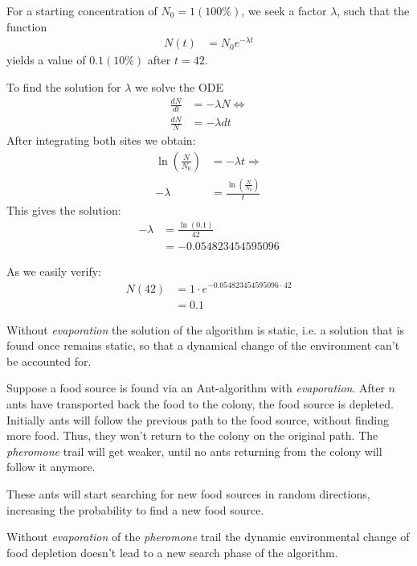\documentclass[10pt,a4paper,boxed]{hmcpset}
\begin{document}
\begin{problem}[Assignment 42]
\end{problem}
\begin{solution}
For a starting concentration of $N_0 = 1 (100\%)$, we seek a factor $\lambda$, such that the function
\begin{align*}
	N(t) & = N_0 e^{-\lambda t}
\end{align*}
yields a value of $0.1 (10\%)$ after $t=42$.

To find the solution for $\lambda$ we solve the ODE
\begin{align*}
	\frac{dN}{dt} & = -\lambda N \Leftrightarrow \\
	\frac{dN}{N} & = -\lambda dt
\end{align*}
After integrating both sites we obtain:
\begin{align*}
	\ln \left( \frac{N}{N_0} \right) & = -\lambda t \Rightarrow \\
	 -\lambda & = \frac{\ln \left( \frac{N}{N_0} \right)}{t} 
\end{align*}
This gives the solution:
\begin{align*}
	 -\lambda & = \frac{\ln \left( 0.1 \right)}{42} \\
	 		  & = -0.054823454595096 
\end{align*}

As we easily verify:
\begin{align*}
	N(42) & = 1 \cdot e^{ -0.054823454595096 \cdot 42} \\
		  & = 0.1
\end{align*}

\end{solution}


\begin{problem}[Assignment 43]
\end{problem}
\begin{solution}
Without \emph{evaporation} the solution of the algorithm is static, i.e. a solution that is found once remains static, so that a dynamical change of the environment can't be accounted for.

Suppose a food source is found via an Ant-algorithm with \emph{evaporation}. After $n$ ants have transported back the food to the colony, the food source is depleted. Initially ants will follow the previous path to the food source, without finding more food. Thus, they won't return to the colony on the original path. The \emph{pheromone} trail will get weaker, until no ants returning from the colony will follow it anymore.

These ants will start searching for new food sources in random directions, increasing the probability to find a new food source.

Without \emph{evaporation} of the \emph{pheromone} trail the dynamic environmental change of food depletion doesn't lead to a new search phase of the algorithm.
\end{solution}
\end{document}
